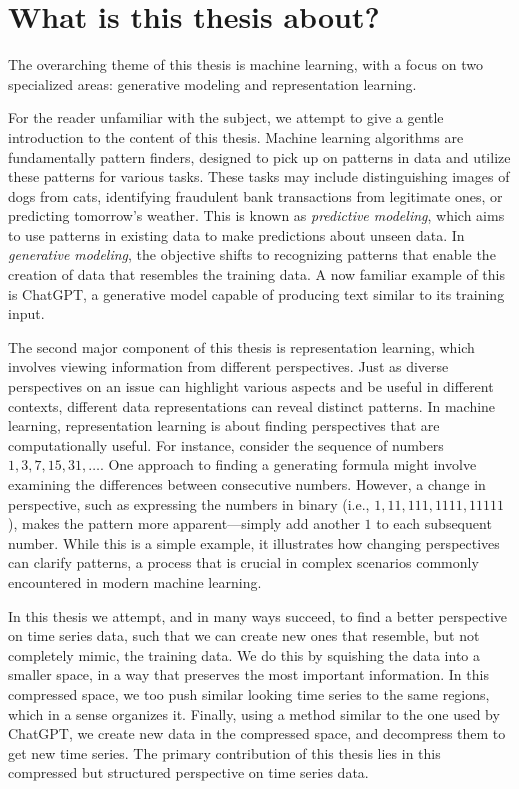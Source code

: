 \documentclass[../../thesis.tex]{subfiles}
\begin{document}
\section{What is this thesis about?}

The overarching theme of this thesis is machine learning, with a focus on two specialized areas: generative modeling and representation learning.\newline

For the reader unfamiliar with the subject, we attempt to give a gentle introduction to the content of this thesis. Machine learning algorithms are fundamentally pattern finders, designed to pick up on patterns in data and utilize these patterns for various tasks. These tasks may include distinguishing images of dogs from cats, identifying fraudulent bank transactions from legitimate ones, or predicting tomorrow's weather. This is known as \textit{predictive modeling}, which aims to use patterns in existing data to make predictions about unseen data. In \textit{generative modeling}, the objective shifts to recognizing patterns that enable the creation of data that resembles the training data. A now familiar example of this is ChatGPT, a generative model capable of producing text similar to its training input.\newline

The second major component of this thesis is representation learning, which involves viewing information from different perspectives. Just as diverse perspectives on an issue can highlight various aspects and be useful in different contexts, different data representations can reveal distinct patterns. In machine learning, representation learning is about finding perspectives that are computationally useful. For instance, consider the sequence of numbers $1, 3, 7, 15, 31, \dots$. One approach to finding a generating formula might involve examining the differences between consecutive numbers. However, a change in perspective, such as expressing the numbers in binary (i.e., $1, 11, 111, 1111, 11111$), makes the pattern more apparent—simply add another $1$ to each subsequent number. While this is a simple example, it illustrates how changing perspectives can clarify patterns, a process that is crucial in complex scenarios commonly encountered in modern machine learning.\newline

In this thesis we attempt, and in many ways succeed, to find a better perspective on time series data, such that we can create new ones that resemble, but not completely mimic, the training data. We do this by squishing the data into a smaller space, in a way that preserves the most important information. In this compressed space, we too push similar looking time series to the same regions, which in a sense organizes it. Finally, using a method similar to the one used by ChatGPT, we create new data in the compressed space, and decompress them to get new time series. The primary contribution of this thesis lies in this compressed but structured perspective on time series data.
\newline
\end{document}

